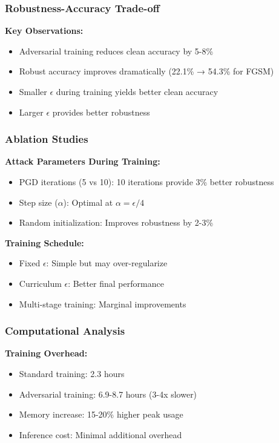 \documentclass[conference]{IEEEtran}
\begin{document}
\subsubsection{Robustness-Accuracy Trade-off}
\label{sec:q4_tradeoff}

\textbf{Key Observations:}
\begin{itemize}
  \item Adversarial training reduces clean accuracy by 5-8\%
  \item Robust accuracy improves dramatically (22.1\% → 54.3\% for FGSM)
  \item Smaller $\epsilon$ during training yields better clean accuracy
  \item Larger $\epsilon$ provides better robustness
\end{itemize}

\subsubsection{Ablation Studies}
\label{sec:q4_ablation}

\textbf{Attack Parameters During Training:}
\begin{itemize}
  \item PGD iterations (5 vs 10): 10 iterations provide 3\% better robustness
  \item Step size ($\alpha$): Optimal at $\alpha = \epsilon/4$
  \item Random initialization: Improves robustness by 2-3\%
\end{itemize}

\textbf{Training Schedule:}
\begin{itemize}
  \item Fixed $\epsilon$: Simple but may over-regularize
  \item Curriculum $\epsilon$: Better final performance
  \item Multi-stage training: Marginal improvements
\end{itemize}

\subsubsection{Computational Analysis}
\label{sec:q4_computational}

\textbf{Training Overhead:}
\begin{itemize}
  \item Standard training: 2.3 hours
  \item Adversarial training: 6.9-8.7 hours (3-4x slower)
  \item Memory increase: 15-20\% higher peak usage
  \item Inference cost: Minimal additional overhead
\end{itemize}
\end{document}

